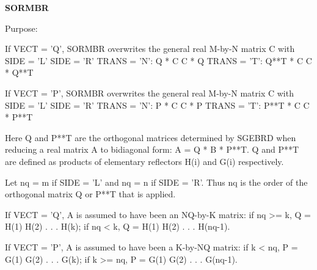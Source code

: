 {\bfseries S\+O\+R\+M\+B\+R} 

 \begin{DoxyParagraph}{Purpose\+: }
\begin{DoxyVerb} If VECT = 'Q', SORMBR overwrites the general real M-by-N matrix C
 with
                 SIDE = 'L'     SIDE = 'R'
 TRANS = 'N':      Q * C          C * Q
 TRANS = 'T':      Q**T * C       C * Q**T

 If VECT = 'P', SORMBR overwrites the general real M-by-N matrix C
 with
                 SIDE = 'L'     SIDE = 'R'
 TRANS = 'N':      P * C          C * P
 TRANS = 'T':      P**T * C       C * P**T

 Here Q and P**T are the orthogonal matrices determined by SGEBRD when
 reducing a real matrix A to bidiagonal form: A = Q * B * P**T. Q and
 P**T are defined as products of elementary reflectors H(i) and G(i)
 respectively.

 Let nq = m if SIDE = 'L' and nq = n if SIDE = 'R'. Thus nq is the
 order of the orthogonal matrix Q or P**T that is applied.

 If VECT = 'Q', A is assumed to have been an NQ-by-K matrix:
 if nq >= k, Q = H(1) H(2) . . . H(k);
 if nq < k, Q = H(1) H(2) . . . H(nq-1).

 If VECT = 'P', A is assumed to have been a K-by-NQ matrix:
 if k < nq, P = G(1) G(2) . . . G(k);
 if k >= nq, P = G(1) G(2) . . . G(nq-1).\end{DoxyVerb}
 
\end{DoxyParagraph}

